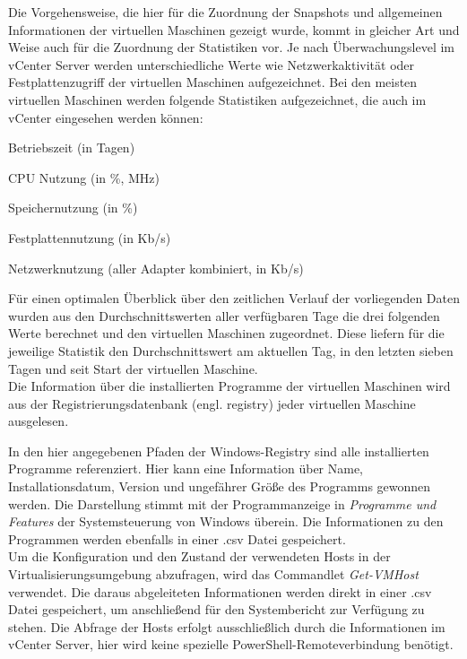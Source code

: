 Die Vorgehensweise, die hier für die Zuordnung der Snapshots und allgemeinen Informationen der virtuellen Maschinen gezeigt wurde, kommt in gleicher Art und Weise auch für die Zuordnung der Statistiken vor. Je nach Überwachungslevel im vCenter Server werden unterschiedliche Werte wie Netzwerkaktivität oder Festplattenzugriff der virtuellen Maschinen aufgezeichnet. Bei den meisten virtuellen Maschinen werden folgende Statistiken aufgezeichnet, die auch im vCenter eingesehen werden können:
\begin{compactitem}
    \item Betriebszeit (in Tagen)
    \item CPU Nutzung (in \%, MHz)
    \item Speichernutzung (in \%)
    \item Festplattennutzung (in Kb/s)
    \item Netzwerknutzung (aller Adapter kombiniert, in Kb/s)
\end{compactitem}
Für einen optimalen Überblick über den zeitlichen Verlauf der vorliegenden Daten wurden aus den Durchschnittswerten aller verfügbaren Tage die drei folgenden Werte berechnet und den virtuellen Maschinen zugeordnet. Diese liefern für die jeweilige Statistik den Durchschnittswert am aktuellen Tag, in den letzten sieben Tagen und seit Start der virtuellen Maschine.\medskip\\
Die Information über die installierten Programme der virtuellen Maschinen wird aus der Registrierungsdatenbank (engl. registry) jeder virtuellen Maschine ausgelesen. 
\begin{compactitem}
    \item {}
    \item {}
\end{compactitem}
In den hier angegebenen Pfaden der Windows-Registry sind alle installierten Programme referenziert. Hier kann eine Information über Name, Installationsdatum, Version und ungefährer Größe des Programms gewonnen werden. Die Darstellung stimmt mit der Programmanzeige in \textit{Programme und Features} der Systemsteuerung von Windows überein. Die Informationen zu den Programmen werden ebenfalls in einer .csv Datei gespeichert.\medskip\\
Um die Konfiguration und den Zustand der verwendeten Hosts in der Virtualisierungsumgebung abzufragen, wird das Commandlet \textit{Get-VMHost} verwendet. Die daraus abgeleiteten Informationen werden direkt in einer .csv Datei gespeichert, um anschließend für den Systembericht zur Verfügung zu stehen. Die Abfrage der Hosts erfolgt ausschließlich durch die Informationen im vCenter Server, hier wird keine spezielle PowerShell-Remoteverbindung benötigt.
\begin{comment}
Voraussetzungen für den Zugriff: Thema Enable PS Remoting als GPO anlagenweit freigeben\\
schon in PowerShell Remote aufgeführt\\
\end{comment}
